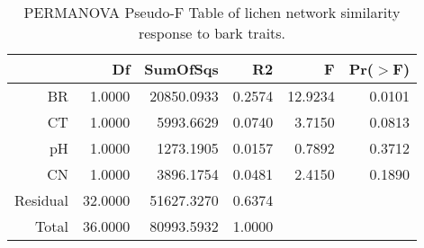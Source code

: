 \begin{table}[ht]
\centering
\begin{tabular}{rrrrrr}
  \hline
 & Df & SumOfSqs & R2 & F & Pr($>$F) \\ 
  \hline
BR & 1.0000 & 20850.0933 & 0.2574 & 12.9234 & 0.0101 \\ 
  CT & 1.0000 & 5993.6629 & 0.0740 & 3.7150 & 0.0813 \\ 
  pH & 1.0000 & 1273.1905 & 0.0157 & 0.7892 & 0.3712 \\ 
  CN & 1.0000 & 3896.1754 & 0.0481 & 2.4150 & 0.1890 \\ 
  Residual & 32.0000 & 51627.3270 & 0.6374 &  &  \\ 
  Total & 36.0000 & 80993.5932 & 1.0000 &  &  \\ 
   \hline
\end{tabular}
\caption{PERMANOVA Pseudo-F Table of lichen network similarity response to bark traits.} 
\label{tab:cn_trait_perm}
\end{table}
